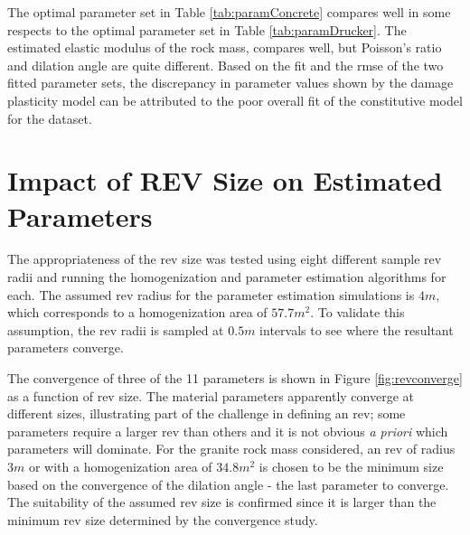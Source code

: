 The optimal parameter set in Table \ref{tab:paramConcrete} compares well in some respects to the optimal parameter set in Table \ref{tab:paramDrucker}. The estimated elastic modulus of the rock mass, compares well, but Poisson's ratio and dilation angle are quite different. Based on the fit and the \acrshort{rmse} of the two fitted parameter sets, the discrepancy in parameter values shown by the damage plasticity model can be attributed to the poor overall fit of the constitutive model for the dataset. 

\section{Impact of REV Size on Estimated Parameters}

The appropriateness of the \acrshort{rev} size was tested using eight different sample \acrshort{rev} radii and running the homogenization and parameter estimation algorithms for each. The assumed \acrshort{rev} radius for the parameter estimation simulations is $4m$, which corresponds to a homogenization area of $57.7 m^2$. To validate this assumption, the \acrshort{rev} radii is sampled at $0.5m$ intervals to see where the resultant parameters converge.

The convergence of three of the 11 parameters is shown in Figure \ref{fig:revconverge} as a function of \acrshort{rev} size. The material parameters apparently converge at different sizes, illustrating part of the challenge in defining an \acrshort{rev}; some parameters require a larger \acrshort{rev} than others and it is not obvious \textit{a priori} which parameters will dominate. For the granite rock mass considered, an \acrshort{rev} of radius $3m$ or with a homogenization area of $34.8 m^2$ is chosen to be the minimum size based on the convergence of the dilation angle - the last parameter to converge. The suitability of the assumed \acrshort{rev} size is confirmed since it is larger than the minimum \acrshort{rev} size determined by the convergence study.

